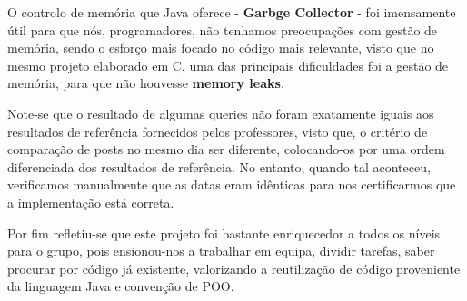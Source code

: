 \documentclass[11pt,a4paper]{article}
\begin{document}
O controlo de memória que Java oferece - \textbf{Garbge Collector} - foi imensamente útil para que nós, programadores, não tenhamos preocupações com gestão de memória, sendo o esforço mais focado no código mais relevante, visto que no mesmo projeto elaborado em C, uma das principais dificuldades foi a gestão de memória, para que não houvesse \textbf{memory leaks}.\newline

Note-se que o resultado de algumas queries não foram exatamente iguais aos resultados de referência fornecidos pelos professores, visto que, o critério de comparação de posts no mesmo dia ser diferente, colocando-os por uma ordem diferenciada dos resultados de referência. No entanto, quando tal aconteceu, verificamos manualmente que as datas eram idênticas para nos certificarmos que a implementação está correta.\newline

Por fim refletiu-se que este projeto foi bastante enriquecedor a todos os níveis para o grupo, pois ensionou-nos a trabalhar em equipa, dividir tarefas, saber procurar por código já existente, valorizando a reutilização de código proveniente da linguagem Java e convenção de POO.
\end{document}
